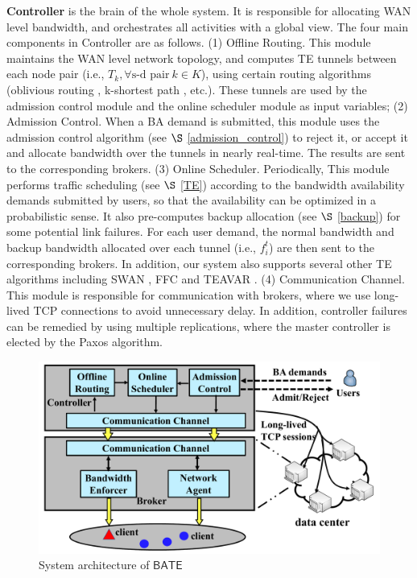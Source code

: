 \documentclass[sigconf]{acmart}
\begin{document}
\textbf{Controller} is the brain of the whole system. It is responsible for allocating WAN level bandwidth, and orchestrates all activities with a global view. The four main components in Controller are as follows.
(1) Offline Routing.
This module maintains the WAN level network topology, and computes TE tunnels between each node pair
 (i.e., $T_k,\forall \text{s-d pair} \ k \in K$), using certain routing algorithms (oblivious routing \cite{SMORE}, k-shortest path \cite{swan}, etc.). 
These tunnels are used by the admission control module and the online scheduler module as input variables;
(2) Admission Control.
When a BA demand is submitted, this module uses the admission control algorithm (see $\S$ \ref{admission_control}) to reject it, or accept it and allocate bandwidth over the tunnels in nearly real-time.
The results are sent to the corresponding brokers.
(3) Online Scheduler. 
Periodically, This module performs traffic scheduling (see $\S$ \ref{TE}) according to the bandwidth availability demands submitted by users, so that the availability can be optimized in a probabilistic sense. 
It also pre-computes backup allocation (see $\S$ \ref{backup}) for some potential link failures.
For each user demand, the normal bandwidth and backup bandwidth allocated over each tunnel (i.e., $f_i^t$) are then sent to the corresponding brokers. 
In addition, our system also supports several other TE algorithms including SWAN \cite{swan}, FFC \cite{FFC} and TEAVAR \cite{Teavar}.
(4) Communication Channel.
This module is responsible for communication with brokers, where we use long-lived TCP connections to avoid unnecessary delay. 
In addition, controller failures can be remedied by using multiple replications, 
where the master controller is elected by the Paxos \cite{lamport1998the} algorithm.

\begin{figure}
\begin{center}
\includegraphics [width=0.9\columnwidth] {fig/inter-DC-WAN-V3.pdf}
\caption{System architecture of $\mathsf{BATE}$}
\label{pic-overview}
\end{center}
\end{figure}
\end{document}
